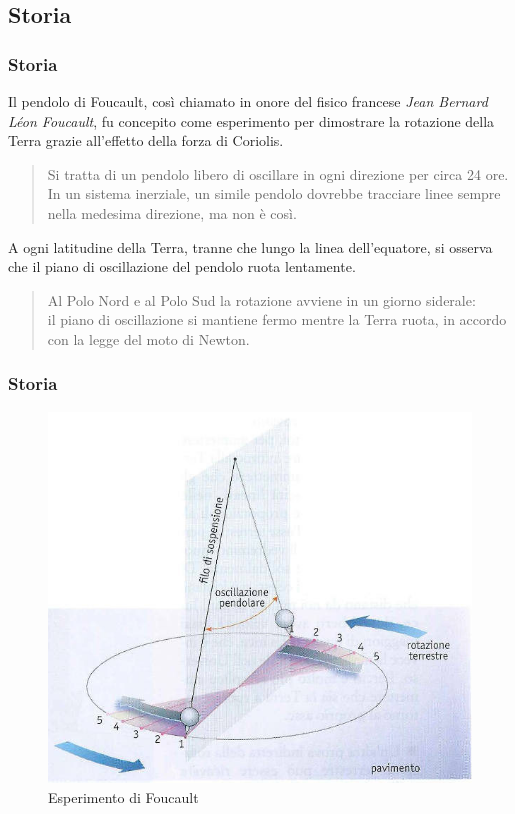 \documentclass[
	10pt, %
]{beamer}
\begin{document}

\subsection{Storia}

\begin{frame}
	\frametitle{Storia}

	Il \alert{pendolo di Foucault}, così chiamato in onore del fisico francese \textit{Jean Bernard Léon Foucault}, fu concepito come esperimento per dimostrare la rotazione della Terra grazie all'effetto della \alert{forza di Coriolis}.

	\smallskip
	\begin{quote}
		Si tratta di un pendolo libero di oscillare in ogni direzione per circa 24 ore. In un sistema inerziale, un simile pendolo dovrebbe tracciare linee sempre nella medesima direzione, ma non è così.
	\end{quote}

	A ogni latitudine della Terra, \alert{tranne che lungo la linea dell'equatore}, si osserva che il piano di oscillazione del pendolo ruota lentamente.

	\smallskip
	\begin{quote}
	Al Polo Nord e al Polo Sud la rotazione avviene in un giorno siderale:\\il piano di oscillazione si mantiene fermo mentre la Terra ruota, in accordo con la legge del moto di Newton.
	\end{quote}
\end{frame}

\begin{frame}
	\frametitle{Storia}

	\begin{figure}
		\includegraphics[width=0.6\linewidth]{Images/Foucault-Illustrazione.jpg}
		\caption{Esperimento di Foucault}
	\end{figure}
\end{frame}
\end{document}
